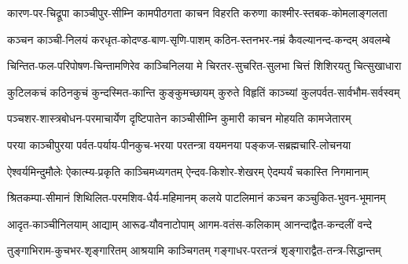 


\twolineshloka
{कारण-पर-चिद्रूपा काञ्चीपुर-सीम्नि कामपीठगता}
{काचन विहरति करुणा काश्मीर-स्तबक-कोमलाङ्गलता}%

\twolineshloka
{कञ्चन काञ्ची-निलयं करधृत-कोदण्ड-बाण-सृणि-पाशम्}
{कठिन-स्तनभर-नम्रं कैवल्यानन्द-कन्दम् अवलम्बे}%

\twolineshloka
{चिन्तित-फल-परिपोषण-चिन्तामणिरेव काञ्चिनिलया मे}
{चिरतर-सुचरित-सुलभा चित्तं शिशिरयतु चित्सुखाधारा}%

\twolineshloka
{कुटिलकचं कठिनकुचं कुन्दस्मित-कान्ति कुङ्कुमच्छायम्}
{कुरुते विहृतिं काञ्च्यां कुलपर्वत-सार्वभौम-सर्वस्वम्}%

\twolineshloka
{पञ्चशर-शास्त्रबोधन-परमाचार्येण दृष्टिपातेन}
{काञ्चीसीम्नि कुमारी काचन मोहयति कामजेतारम्}%

\twolineshloka
{परया काञ्चीपुरया पर्वत-पर्याय-पीनकुच-भरया}
{परतन्त्रा वयमनया पङ्कज-सब्रह्मचारि-लोचनया}%

\twolineshloka
{ऐश्वर्यमिन्दुमौलेः ऐकात्म्य-प्रकृति काञ्चिमध्यगतम्}
{ऐन्दव-किशोर-शेखरम् ऐदम्पर्यं चकास्ति निगमानाम्}%

\twolineshloka
{श्रितकम्पा-सीमानं शिथिलित-परमशिव-धैर्य-महिमानम्}
{कलये पाटलिमानं कञ्चन कञ्चुकित-भुवन-भूमानम्}%

\twolineshloka
{आदृत-काञ्चीनिलयाम् आद्याम् आरूढ-यौवनाटोपाम्}
{आगम-वतंस-कलिकाम् आनन्दाद्वैत-कन्दलीं वन्दे}%

\twolineshloka
{तुङ्गाभिराम-कुचभर-शृङ्गारितम् आश्रयामि काञ्चिगतम्}
{गङ्गाधर-परतन्त्रं शृङ्गाराद्वैत-तन्त्र-सिद्धान्तम्}%


